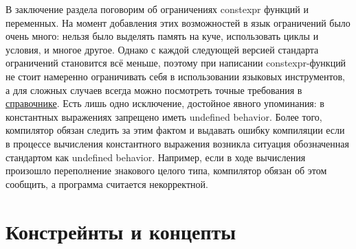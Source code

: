 
В заключение раздела поговорим об ограничениях constexpr функций и переменных. На момент добавления этих возможностей в язык ограничений было очень много: нельзя было выделять память на куче, использовать циклы и условия, и многое другое. Однако с каждой следующей версией стандарта ограничений становится всё меньше, поэтому при написании constexpr-функций не стоит намеренно ограничивать себя в использовании языковых инструментов, а для сложных случаев всегда можно посмотреть точные требования в \href{https://en.cppreference.com/w/cpp/language/constexpr#:~:text=A%20constexpr%20function%20must%20satisfy%20the%20following%20requirements%3A}{справочнике}. Есть лишь одно исключение, достойное явного упоминания: в константных выражениях запрещено иметь undefined behavior. Более того, компилятор обязан следить за этим фактом и выдавать ошибку компиляции если в процессе вычисления константного выражения возникла ситуация обозначенная стандартом как undefined behavior. Например, если в ходе вычисления произошло переполнение знакового целого типа, компилятор обязан об этом сообщить, а программа считается некорректной.

\section{Констрейнты и концепты}
